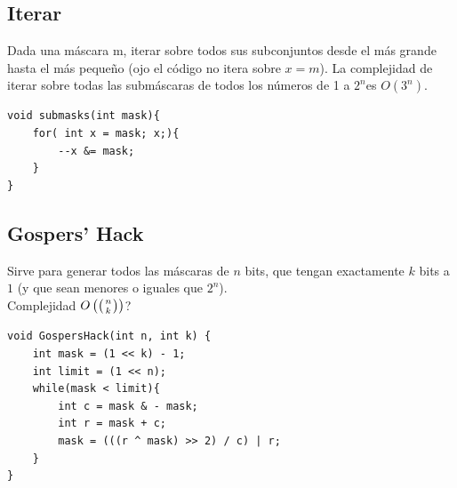 \subsection{Iterar}
Dada una máscara m, iterar sobre todos sus subconjuntos desde el más grande hasta el más pequeño (ojo el código no itera sobre $x=m$). La complejidad de iterar sobre todas las submáscaras de todos los números de 1 a $2^n $es $O(3^n)$.
\begin{verbatim}
void submasks(int mask){
    for( int x = mask; x;){
        --x &= mask;
    }
}
\end{verbatim}



\subsection{Gospers’ Hack}
Sirve para generar todos las máscaras de $n$ bits, que tengan exactamente $k$ bits a $1$ (y que sean menores o iguales que $2^n$). \\
Complejidad $O\pa{\binom{n}{k}}$?
\begin{verbatim}
void GospersHack(int n, int k) {
    int mask = (1 << k) - 1;
    int limit = (1 << n);
    while(mask < limit){
        int c = mask & - mask;
        int r = mask + c;
        mask = (((r ^ mask) >> 2) / c) | r;
    }
}
\end{verbatim}


